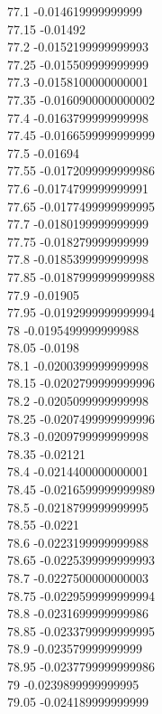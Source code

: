 {77.1	-0.014619999999999\\
77.15	-0.01492\\
77.2	-0.0152199999999993\\
77.25	-0.015509999999999\\
77.3	-0.0158100000000001\\
77.35	-0.0160900000000002\\
77.4	-0.0163799999999998\\
77.45	-0.0166599999999999\\
77.5	-0.01694\\
77.55	-0.0172099999999986\\
77.6	-0.0174799999999991\\
77.65	-0.0177499999999995\\
77.7	-0.0180199999999999\\
77.75	-0.018279999999999\\
77.8	-0.0185399999999998\\
77.85	-0.0187999999999988\\
77.9	-0.01905\\
77.95	-0.0192999999999994\\
78	-0.0195499999999988\\
78.05	-0.0198\\
78.1	-0.0200399999999998\\
78.15	-0.0202799999999996\\
78.2	-0.0205099999999998\\
78.25	-0.0207499999999996\\
78.3	-0.0209799999999998\\
78.35	-0.02121\\
78.4	-0.0214400000000001\\
78.45	-0.0216599999999989\\
78.5	-0.0218799999999995\\
78.55	-0.0221\\
78.6	-0.0223199999999988\\
78.65	-0.0225399999999993\\
78.7	-0.0227500000000003\\
78.75	-0.0229599999999994\\
78.8	-0.0231699999999986\\
78.85	-0.0233799999999995\\
78.9	-0.023579999999999\\
78.95	-0.0237799999999986\\
79	-0.0239899999999995\\
79.05	-0.024189999999999\\
}
